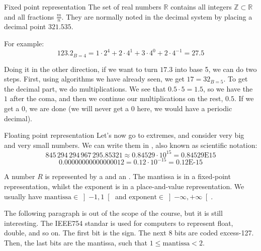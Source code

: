 \documentclass[a4paper]{article}
\begin{document}
\begin{parag}{Fixed point representation}
    The set of real numbers $\mathbb{R}$ contains all integers $\mathbb{Z} \subset \mathbb{R}$ and all fractions $\frac{m}{n}$. They are normally noted in the decimal system by placing a decimal point $321.535$.

    For example: 
    \[123.2_{B=4} = 1\cdot 2^4 + 2\cdot 4^1 + 3\cdot 4^0 + 2\cdot 4^{-1} = 27.5\]
    
    Doing it in the other direction, if we want to turn $17.3$ into base 5, we can do two steps. First, using algorithms we have already seen, we get $17 = 32_{B=5}$. To get the decimal part, we do multiplications. We see that $0.5\cdot 5 = 1.5$, so we have the $1$ after the coma, and then we continue our multiplications on the rest, $0.5$. If we get a 0, we are done (we will never get a 0 here, we would have a periodic decimal).
\end{parag}

\begin{parag}{Floating point representation}
    Let's now go to extremes, and consider very big and very small numbers. We can write them in , also known as scientific notation: 
    \[845\,294\,294\,967\,295.85321 \approx 0.84529 \cdot 10^{15} = 0.84529\text{E15}\]
    \[0.00000000000000012 = 0.12\cdot 10^{-15} = 0.12\text{E-15}\]
    
    A number $R$ is represented by a  and an . The mantissa is in a fixed-point representation, whilst the exponent is in a place-and-value representation. We usually have $\text{mantissa} \in \left]-1, 1\right[ $ and $\text{exponent} \in \left]-\infty, +\infty\right[ $.

    The following paragraph is out of the scope of the course, but it is still interesting. The IEEE754 standar is used for computers to represent float, double, and so on. The first bit is the sign. The next 8 bits are coded excess-127. Then, the last bits are the mantissa, such that $1 \leq \text{mantissa} < 2$.
\end{parag}
\end{document}
